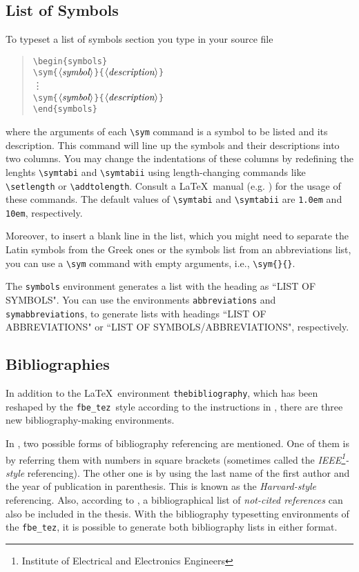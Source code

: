 \documentclass[12pt]{article}
\newcommand\fbe{{\tt fbe\_tez}}
\newcommand{\bq}{\begin{quotation}\noindent}
\newcommand{\eq}{\end{quotation}}
\renewcommand{\arg}[1]{$\langle\mbox{\it #1}\rangle$}
\begin{document}
\subsection{List of Symbols}
To typeset a list of symbols section you type in your source file
\bq
\verb/\begin{symbols}/ \\
\verb/\sym{/\arg{symbol}\verb/}{/\arg{description}\verb/}/\\
\verb//\vdots \\
\verb/\sym{/\arg{symbol}\verb/}{/\arg{description}\verb/}/\\
\verb/\end{symbols}/
\eq
where the arguments of each \verb/\sym/ command is a symbol to be
listed and its description. This command will line up the symbols and
their descriptions into two columns. You may change the indentations
of these columns by redefining the lenghts \verb/\symtabi/ and
\verb/\symtabii/ using length-changing commands like \verb/\setlength/
or \verb/\addtolength/. Consult a \LaTeX\ manual (e.g. \cite{latex})
for the usage of these commands. The default values of \verb/\symtabi/
and \verb/\symtabii/ are {\tt 1.0em} and {\tt 10em}, respectively.

Moreover, to insert a blank line in the list, which you might need to
separate the Latin symbols from the Greek ones or the symbols list
from an abbreviations list, you can use a \verb/\sym/ command with
empty arguments, i.e., \verb/\sym{}{}/.

The \verb/symbols/ environment generates a list with the heading
as ``LIST OF SYMBOLS". You can use the environments
\verb/abbreviations/ and \verb/symabbreviations/, to generate
lists with headings ``LIST OF ABBREVIATIONS" or ``LIST OF
SYMBOLS/\-ABBREVIATIONS", respectively.

\subsection{Bibliographies}
In addition to the \LaTeX\ environment {\tt thebibliography}, which
has been reshaped by the \fbe\ style according to the instructions in
\cite{fbeman}, there are three new bibliography-making environments.

In \cite{fbeman}, two possible forms of bibliography referencing are
mentioned. One of them is by referring them with numbers in square
brackets (sometimes called the {\em IEEE\/\footnote{Institute of
Electrical and Electronics Engineers}-style} referencing). The other
one is by using the last name of the first author and the year of
publication in parenthesis. This is known as the {\em Harvard-style\/}
referencing. Also, according to \cite{fbeman}, a bibliographical list
of {\em not-cited references} can also be included in the thesis. With
the bibliography typesetting environments of the \fbe, it is possible
to generate both bibliography lists in either format.
\end{document}
